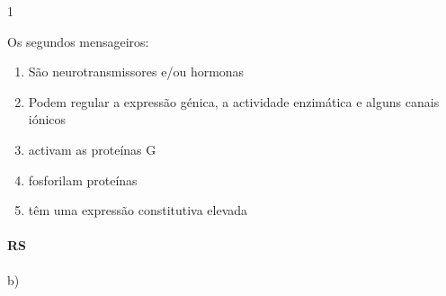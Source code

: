 \documentclass[\mainfilename]{subfiles}
\begin{document}
\begin{questionBox}1{} %
    
    Os segundos mensageiros:
    \begin{enumerate}[label=\alph{enumi})]
        \item São neurotransmissores e/ou hormonas
        \item Podem regular a expressão génica, a actividade enzimática e alguns canais iónicos 
        \item activam as proteínas G
        \item fosforilam proteínas
        \item têm uma expressão constitutiva elevada
    \end{enumerate}

    \paragraph*{RS} b)

    
\end{questionBox}
\end{document}
